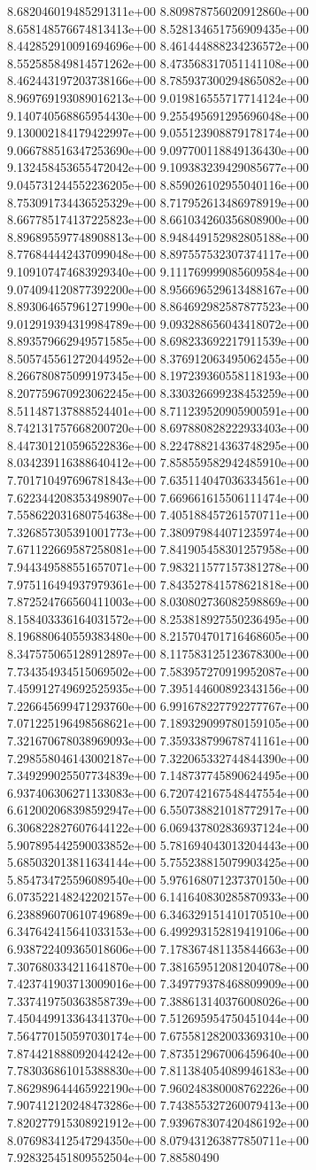 	8.682046019485291311e+00	8.809878756020912860e+00	8.658148576674813413e+00	8.528134651756909435e+00	8.442852910091694696e+00	8.461444888234236572e+00	8.552585849814571262e+00	8.473568317051141108e+00	8.462443197203738166e+00	8.785937300294865082e+00	8.969769193089016213e+00	9.019816555717714124e+00	9.140740568865954430e+00	9.255495691295696048e+00	9.130002184179422997e+00	9.055123908879178174e+00	9.066788516347253690e+00	9.097700118849136430e+00	9.132458453655472042e+00	9.109383239429085677e+00	9.045731244552236205e+00	8.859026102955040116e+00	8.753091734436525329e+00	8.717952613486978919e+00	8.667785174137225823e+00	8.661034260356808900e+00	8.896895597748908813e+00	8.948449152982805188e+00	8.776844442437099048e+00	8.897557532307374117e+00	9.109107474683929340e+00	9.111769999085609584e+00	9.074094120877392200e+00	8.956696529613488167e+00	8.893064657961271990e+00	8.864692982587877523e+00	9.012919394319984789e+00	9.093288656043418072e+00	8.893579662949571585e+00	8.698233692217911539e+00	8.505745561272044952e+00	8.376912063495062455e+00	8.266780875099197345e+00	8.197239360558118193e+00	8.207759670923062245e+00	8.330326699238453259e+00	8.511487137888524401e+00	8.711239520905900591e+00	8.742131757668200720e+00	8.697880828222933403e+00	8.447301210596522836e+00	8.224788214363748295e+00	8.034239116388640412e+00	7.858559582942485910e+00	7.701710497696781843e+00	7.635114047036334561e+00	7.622344208353498907e+00	7.669661615506111474e+00	7.558622031680754638e+00	7.405188457261570711e+00	7.326857305391001773e+00	7.380979844071235974e+00	7.671122669587258081e+00	7.841905458301257958e+00	7.944349588551657071e+00	7.983211577157381278e+00	7.975116494937979361e+00	7.843527841578621818e+00	7.872524766560411003e+00	8.030802736082598869e+00	8.158403336164031572e+00	8.253818927550236495e+00	8.196880640559383480e+00	8.215704701716468605e+00	8.347575065128912897e+00	8.117583125123678300e+00	7.734354934515069502e+00	7.583957270919952087e+00	7.459912749692525935e+00	7.395144600892343156e+00	7.226645699471293760e+00	6.991678227792277767e+00	7.071225196498568621e+00	7.189329099780159105e+00	7.321670678038969093e+00	7.359338799678741161e+00	7.298558046143002187e+00	7.322065332744844390e+00	7.349299025507734839e+00	7.148737745890624495e+00	6.937406306271133083e+00	6.720742167548447554e+00	6.612002068398592947e+00	6.550738821018772917e+00	6.306822827607644122e+00	6.069437802836937124e+00	5.907895442590033852e+00	5.781694043013204443e+00	5.685032013811634144e+00	5.755238815079903425e+00	5.854734725596089540e+00	5.976168071237370150e+00	6.073522148242202157e+00	6.141640830285870933e+00	6.238896070610749689e+00	6.346329151410170510e+00	6.347642415641033153e+00	6.499293152819419106e+00	6.938722409365018606e+00	7.178367481135844663e+00	7.307680334211641870e+00	7.381659512081204078e+00	7.423741903713009016e+00	7.349779378468809909e+00	7.337419750363858739e+00	7.388613140376008026e+00	7.450449913364341370e+00	7.512695954750451044e+00	7.564770150597030174e+00	7.675581282003369310e+00	7.874421888092044242e+00	7.873512967006459640e+00	7.783036861015388830e+00	7.811384054089946183e+00	7.862989644465922190e+00	7.960248380008762226e+00	7.907412120248473286e+00	7.743855327260079413e+00	7.820277915308921912e+00	7.939678307420486192e+00	8.076983412547294350e+00	8.079431263877850711e+00	7.928325451809552504e+00	7.88580490